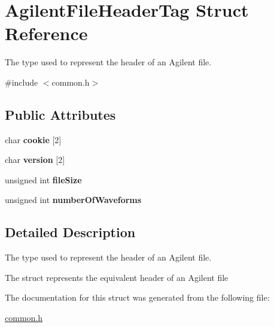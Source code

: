 \hypertarget{structAgilentFileHeaderTag}{
\section{AgilentFileHeaderTag Struct Reference}
\label{structAgilentFileHeaderTag}
}


The type used to represent the header of an Agilent file.  




{\ttfamily \#include $<$common.h$>$}

\subsection*{Public Attributes}
\begin{DoxyCompactItemize}
\item 
\hypertarget{structAgilentFileHeaderTag_a22f4cfbe695662173f30d6725b68afb9}{
char {\bfseries cookie} \mbox{[}2\mbox{]}}
\label{structAgilentFileHeaderTag_a22f4cfbe695662173f30d6725b68afb9}

\item 
\hypertarget{structAgilentFileHeaderTag_a440d1cfd840f231f3bd2f02bebdb65cc}{
char {\bfseries version} \mbox{[}2\mbox{]}}
\label{structAgilentFileHeaderTag_a440d1cfd840f231f3bd2f02bebdb65cc}

\item 
\hypertarget{structAgilentFileHeaderTag_aee3785a72bcfbca123f7a0cdde985c9f}{
unsigned int {\bfseries fileSize}}
\label{structAgilentFileHeaderTag_aee3785a72bcfbca123f7a0cdde985c9f}

\item 
\hypertarget{structAgilentFileHeaderTag_aa598a2d2a412bbde0989d0748f8b41a5}{
unsigned int {\bfseries numberOfWaveforms}}
\label{structAgilentFileHeaderTag_aa598a2d2a412bbde0989d0748f8b41a5}

\end{DoxyCompactItemize}


\subsection{Detailed Description}
The type used to represent the header of an Agilent file. 

The struct represents the equivalent header of an Agilent file 

The documentation for this struct was generated from the following file:\begin{DoxyCompactItemize}
\item 
\hyperlink{common_8h}{common.h}\end{DoxyCompactItemize}
